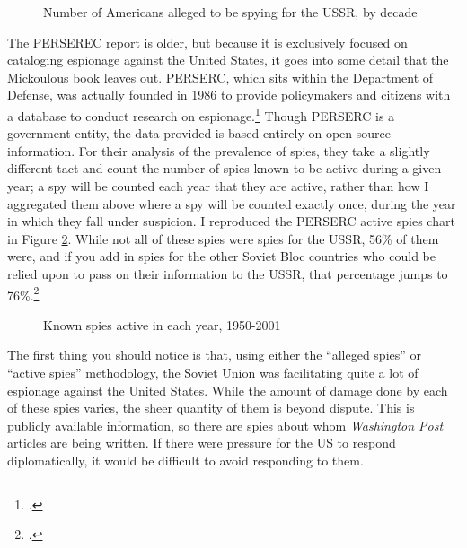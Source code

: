 \documentclass[11pt]{memoir}
\begin{document}
\begin{refsegment}
\begin{figure}[ht]
  \centering
  
  \label{decade_spies}
  \caption{Number of Americans alleged to be spying for the USSR, by decade}
\end{figure}

The PERSEREC report is older, but because it is exclusively focused on cataloging espionage against the United States, it goes into some detail that the Mickoulous book leaves out. PERSERC, which sits within the Department of Defense, was actually founded in 1986 to provide policymakers and citizens with a database to conduct research on espionage.\footcite[p.~v]{herbig_espionage_2002} Though PERSERC is a government entity, the data provided is based entirely on open-source information. For their analysis of the prevalence of spies, they take a slightly different tact and count the number of spies known to be active during a given year; a spy will be counted each year that they are active, rather than how I aggregated them above where a spy will be counted exactly once, during the year in which they fall under suspicion. I reproduced the PERSERC active spies chart in Figure \ref{perserec_spies}. While not all of these spies were spies for the USSR, 56\% of them were, and if you add in spies for the other Soviet Bloc countries who could be relied upon to pass on their information to the USSR, that percentage jumps to 76\%.\footcite[p.~62-63. Herbig and Wiskoff use this method to estimate the amount of espionage undertaken on behalf of the USSR, directly or otherwise.]{herbig_espionage_2002}

\begin{figure}[ht]
  \centering
  
  \label{perserec_spies}
  \caption{Known spies active in each year, 1950-2001}
\end{figure}

The first thing you should notice is that, using either the ``alleged spies'' or ``active spies'' methodology, the Soviet Union was facilitating quite a lot of espionage against the United States. While the amount of damage done by each of these spies varies, the sheer quantity of them is beyond dispute. This is publicly available information, so there are spies about whom \emph{Washington Post} articles are being written. If there were pressure for the US to respond diplomatically, it would be difficult to avoid responding to them.


\end{refsegment}
\end{document}
